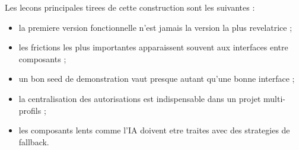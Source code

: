 Les lecons principales tirees de cette construction sont les suivantes :

\begin{itemize}[leftmargin=1.2cm]
  \item la premiere version fonctionnelle n'est jamais la version la plus revelatrice ;
  \item les frictions les plus importantes apparaissent souvent aux interfaces entre composants ;
  \item un bon seed de demonstration vaut presque autant qu'une bonne interface ;
  \item la centralisation des autorisations est indispensable dans un projet multi-profils ;
  \item les composants lents comme l'IA doivent etre traites avec des strategies de fallback.
\end{itemize}


